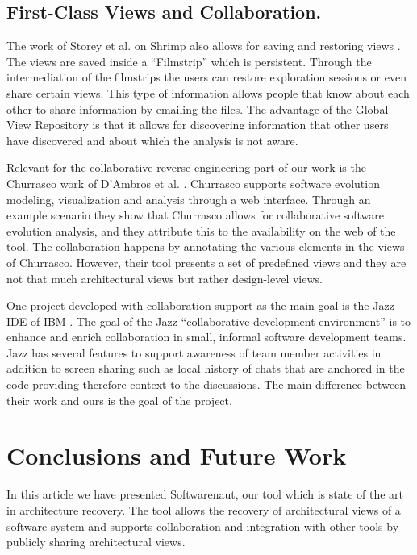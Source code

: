 \documentclass[preprint,12pt]{elsarticle}
\begin{document}
\subsection {First-Class Views and Collaboration.} The work of Storey et al. on Shrimp also allows for saving and restoring views \cite{rayside-flow}. The views are saved inside a ``Filmstrip'' which is persistent. Through the intermediation of the filmstrips the users can restore exploration sessions or even share certain views. This type of information allows people that know about each other to share information by emailing the files. The advantage of the Global View Repository is that it allows for discovering information that other users have discovered and about which the analysis is not aware. 


Relevant for the collaborative reverse engineering part of our work is the Churrasco work of D’Ambros et al. \cite{dambros-churrasco}. Churrasco supports software evolution modeling, visualization and analysis through a web interface. 
Through an example scenario they show that Churrasco allows for collaborative software evolution analysis, and they attribute this to the availability on the web of the tool. The collaboration happens by annotating the various elements in the views of Churrasco. However, their tool presents a set of predefined views and they are not that much architectural views but rather design-level views. 

One project developed with collaboration support as the main goal is the Jazz IDE of IBM \cite{hupfer-jazz}. The goal of the Jazz ``collaborative development environment'' is to enhance and enrich collaboration in small, informal software development teams. Jazz has several features to support awareness of team member activities in addition to screen sharing such as local history of chats that are anchored in the code providing therefore context to the discussions. The main difference between their work and ours is the goal of the project.





\section {Conclusions and Future Work}
\label {sec:conc}

In this article we have presented Softwarenaut, our tool which is state of the art in architecture recovery. The tool allows the recovery of architectural views of a software system and supports collaboration and integration with other tools by publicly sharing architectural views.
\end{document}

